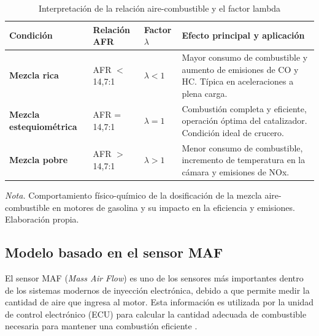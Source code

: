 \begin{table}[htbp]
	\centering
	\captionsetup{labelformat=simple, labelsep=newline, textfont=it, labelfont=bf}
	\caption{Interpretación de la relación aire-combustible y el factor lambda}
	\label{tab:afr}
	\vspace{0.3cm}
	
	\begin{tabularx}{\linewidth}{p{3.8cm} p{2.8cm} p{2.2cm} X}
		\toprule %
		\rowcolor[rgb]{0.851, 0.851, 0.851}
		\textbf{Condición} & \textbf{Relación AFR} & \textbf{Factor $\lambda$} & \textbf{Efecto principal y aplicación} \\
		\midrule %
		\textbf{Mezcla rica} & AFR $<$ 14,7:1 & $\lambda < 1$ & Mayor consumo de combustible y aumento de emisiones de CO y HC. Típica en aceleraciones a plena carga. \\
		\addlinespace
		\textbf{Mezcla estequiométrica} & AFR = 14,7:1 & $\lambda = 1$ & Combustión completa y eficiente, operación óptima del catalizador. Condición ideal de crucero. \\
		\addlinespace
		\textbf{Mezcla pobre} & AFR $>$ 14,7:1 & $\lambda > 1$ & Menor consumo de combustible, incremento de temperatura en la cámara y emisiones de NOx. \\
		\bottomrule %
	\end{tabularx}
	\vspace{0.2cm}
	
	\begin{flushleft}
		\footnotesize \textit{Nota.} Comportamiento físico-químico de la dosificación de la mezcla aire-combustible en motores de gasolina y su impacto en la eficiencia y emisiones. Elaboración propia.
	\end{flushleft}
\end{table}

\subsection{Modelo basado en el sensor MAF}

El sensor MAF (\textit{Mass Air Flow}) es uno de los sensores más importantes dentro de los sistemas modernos de inyección electrónica, debido a que permite medir la cantidad de aire que ingresa al motor. Esta información es utilizada por la unidad de control electrónico (ECU) para calcular la cantidad adecuada de combustible necesaria para mantener una combustión eficiente \citep{Bosch_Automotive, Fundamentos_Inyeccion}. 

